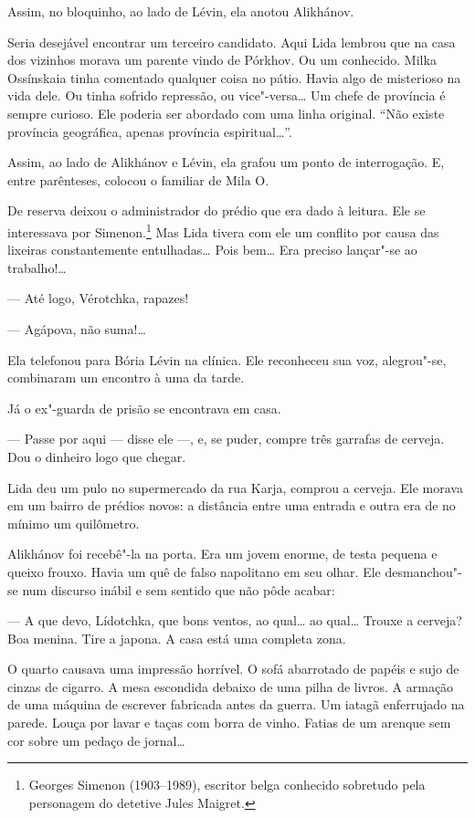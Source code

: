 Assim, no bloquinho, ao lado de Lévin, ela anotou Alikhánov.

Seria desejável encontrar um terceiro candidato. Aqui Lida lembrou que
na casa dos vizinhos morava um parente vindo de Pórkhov. Ou um
conhecido. Milka Ossínskaia tinha comentado qualquer coisa no pátio.
Havia algo de misterioso na vida dele. Ou tinha sofrido repressão, ou
vice"-versa\ldots{} Um chefe de província é sempre curioso. Ele poderia ser
abordado com uma linha original. ``Não existe província geográfica,
apenas província espiritual\ldots{}''.

Assim, ao lado de Alikhánov e Lévin, ela grafou um ponto de
interrogação. E, entre parênteses, colocou o familiar de Mila O.

De reserva deixou o administrador do prédio que era dado à leitura. Ele
se interessava por Simenon.\footnote{Georges Simenon (1903--1989),
  escritor belga conhecido sobretudo pela personagem do detetive Jules
  Maigret.} Mas Lida tivera com ele um conflito por causa das lixeiras
constantemente entulhadas\ldots{} Pois bem\ldots{} Era preciso lançar"-se ao
trabalho!\ldots{}

--- Até logo, Vérotchka, rapazes!

--- Agápova, não suma!\ldots{}

Ela telefonou para Bória Lévin na clínica. Ele reconheceu sua voz,
alegrou"-se, combinaram um encontro à uma da tarde.

Já o ex"-guarda de prisão se encontrava em casa.

--- Passe por aqui --- disse ele ---, e, se puder, compre três garrafas
de cerveja. Dou o dinheiro logo que chegar.

Lida deu um pulo no supermercado da rua Karja, comprou a cerveja. Ele
morava em um bairro de prédios novos: a distância entre uma entrada e
outra era de no mínimo um quilômetro.

Alikhánov foi recebê"-la na porta. Era um jovem enorme, de testa pequena
e queixo frouxo. Havia um quê de falso napolitano em seu olhar. Ele
desmanchou"-se num discurso inábil e sem sentido que não pôde acabar:

--- A que devo, Lídotchka, que bons ventos, ao qual\ldots{} ao qual\ldots{} Trouxe
a cerveja? Boa menina. Tire a japona. A casa está uma completa zona.

O quarto causava uma impressão horrível. O sofá abarrotado de papéis e
sujo de cinzas de cigarro. A mesa escondida debaixo de uma pilha de
livros. A armação de uma máquina de escrever fabricada antes da guerra.
Um iatagã enferrujado na parede. Louça por lavar e taças com borra de
vinho. Fatias de um arenque sem cor sobre um pedaço de jornal\ldots{}

